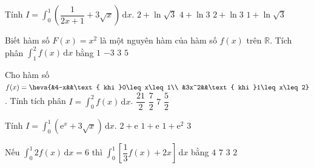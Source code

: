 \begin{ex}%
	Tính $I=\displaystyle\int_0^1{\left(\dfrac1{2x+1}+3\sqrt x\right)}\mathrm{\,d}x$. 
	\choice 
		{\True $2+\ln\sqrt3$} 
		{$4+\ln 3$} 
		{$2+\ln  3$}
		{$1+\ln\sqrt3$} 
\end{ex}

\begin{ex}%
	Biết hàm số $F(x)=x^2$ là một nguyên hàm của hàm số $f(x)$ trên  $\mathbb{R}$. Tích phân $\displaystyle\int_1^2f(x) \mathrm{\,d}x$ bằng
	\choice 
		{$1$} 
		{$-3$} 
		{\True $3$} 
		{$5$} 
\end{ex}

\begin{ex}%
	 Cho hàm số $f(x)=\heva{&4-x&&\text{ khi }0\leq x\leq 1\\
	&3x^2&&\text{ khi }1\leq x\leq 2}$. Tính tích phân $I=\int_0^2f(x)\mathrm{\,d}x$. 
	 \choice
		 {\True $\dfrac{21}{2}$}
		{$\dfrac{7}{2}$} 
		 {$7$}
		 {$\dfrac{5}{2}$}
\end{ex}

\begin{ex}%
	Tính $I=\displaystyle \int_0^1 \left( \mathrm{e}^x +3\sqrt{x} \right) \mathrm{\,d}x$. 
	 \choice
		 {$2+\mathrm{e}$}
		{$1+\mathrm{e}$} 
		 {$1+\mathrm{e}^2$}
		 {$3$}
\end{ex}

\begin{ex}%
	Nếu $\displaystyle\int_0^1{2f(x)\mathrm{\,d}x=6}$ thì  $\displaystyle\int_0^1{\left[\dfrac13f(x)+2x\right]\mathrm{\,d}x}$ bằng
	 \choice
		{$4$} 
		 {$7$}
		{$3$} 
		{\True  $2$}
\end{ex}

